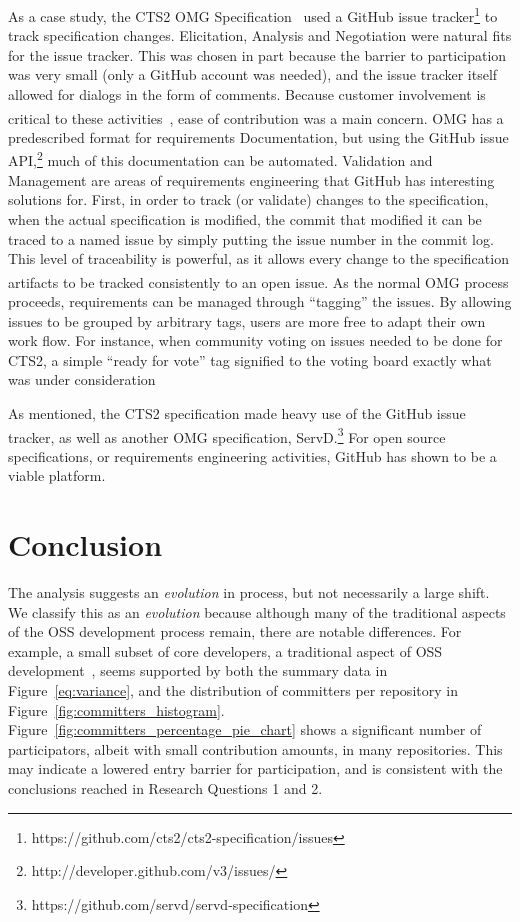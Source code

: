 \documentclass{proc}
\begin{document}
{{{{{As a case study, the CTS2 OMG\textsuperscript{\textregistered} Specification~\cite{cts2} used a GitHub issue tracker\footnote{https://github.com/cts2/cts2-specification/issues} to track specification changes. Elicitation, Analysis and Negotiation were natural fits for the issue tracker. This was chosen in part because the barrier to participation was very small (only a GitHub account was needed), and the issue tracker itself allowed for dialogs in the form of comments. Because customer involvement is critical to these activities~\cite{paetsch2003requirements}, ease of contribution was a main concern. OMG\textsuperscript{\textregistered} has a predescribed format for requirements Documentation, but using the GitHub issue API,\footnote{http://developer.github.com/v3/issues/} much of this documentation can be automated.
Validation and Management are areas of requirements engineering that GitHub has interesting solutions for. First, in order to track (or validate) changes to the specification, when the actual specification is modified, the commit that modified it can be traced to a named issue by simply putting the issue number in the commit log. This level of traceability is powerful, as it allows every change to the specification artifacts to be tracked consistently to an open issue. As the normal OMG\textsuperscript{\textregistered} process proceeds, requirements can be managed through ``tagging'' the issues. By allowing issues to be grouped by arbitrary tags, users are more free to adapt their own work flow. For instance, when community voting on issues needed to be done for CTS2, a simple ``ready for vote'' tag signified to the voting board exactly what was under consideration

As mentioned, the CTS2 specification made heavy use of the GitHub issue tracker, as well as another OMG\textsuperscript{\textregistered} specification, ServD.\footnote{https://github.com/servd/servd-specification} For open source specifications, or requirements engineering activities, GitHub has shown to be a viable platform. 

\section{Conclusion}
The analysis suggests an \textit{evolution} in process, but not necessarily a large shift. We classify this as an \textit{evolution} because although many of the traditional aspects of the OSS development process remain, there are notable differences. For example, a small subset of core developers, a traditional aspect of OSS development~\cite{mockus2000case,mockus2002two,krishnamurthy2002cave}, seems supported by both the summary data in Figure~\ref{eq:variance}, and the distribution of committers per repository in Figure~\ref{fig:committers_histogram}. Figure~\ref{fig:committers_percentage_pie_chart} shows a significant number of participators, albeit with small contribution amounts, in many repositories. This may indicate a lowered entry barrier for participation, and is consistent with the conclusions reached in Research Questions 1 and 2.

}}}}}
\end{document}
